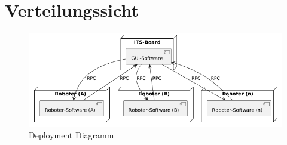 \chapter{Verteilungssicht}

\begin{figure}[h!]
	\centering
	\includegraphics[scale=.5]{diagrams/deployment.png}
	\caption{Deployment Diagramm}
	\label{fig:deployment-grafik}
\end{figure}









